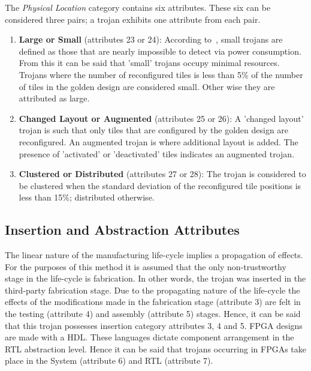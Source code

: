\documentclass[conference]{IEEEtran}
\begin{document}
The \textit{Physical Location} category contains six attributes.
These six can be considered three pairs; a trojan exhibits one attribute from each pair. 
\begin{enumerate}
	\item \textbf{Large or Small} (attributes 23 or 24): According to~\cite{samerAttribute}, small trojans are defined as those that are nearly impossible to detect via power consumption. From this it can be said that 'small' trojans occupy minimal resources. Trojans where the number of reconfigured tiles is less than 5\% of the number of tiles in the golden design are considered small. Other wise they are attributed as large.
	\item \textbf{Changed Layout or Augmented} (attributes 25 or 26): A 'changed layout' trojan is such that only tiles that are configured by the golden design are reconfigured. An augmented trojan is where additional layout is added. The presence of 'activated' or 'deactivated' tiles indicates an augmented trojan. 
	\item \textbf{Clustered or Distributed} (attributes 27 or 28): The trojan is considered to be clustered when the standard deviation of the reconfigured tile positions is less than 15\%; distributed otherwise.
\end{enumerate}
\subsection{Insertion and Abstraction Attributes}
The linear nature of the manufacturing life-cycle implies a propagation of effects.
For the purposes of this method it is assumed that the only non-trustworthy stage in the life-cycle is fabrication.
In other words, the trojan was inserted in the third-party fabrication stage.
Due to the propagating nature of the life-cycle the effects of the modifications made in the fabrication stage (attribute 3) are felt in the testing (attribute 4) and assembly (attribute 5) stages.
Hence, it can be said that this trojan possesses insertion category attributes 3, 4 and 5.
\acrshort{FPGA} designs are made with a \acrshort{HDL}.
These languages dictate component arrangement in the \acrfull{RTL} abstraction level.
Hence it can be said that trojans occurring in \acrshort{FPGAs} take place in the System (attribute 6) and \acrshort{RTL} (attribute 7).
  
\end{document}
